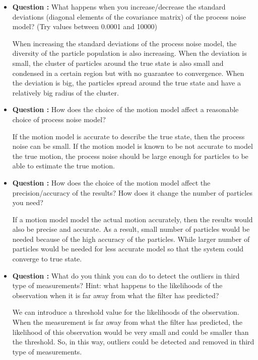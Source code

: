 \documentclass[11pt,a4paper]{article}
\begin{document}
\begin{itemize}
	\item\addtocounter{Counter}{1}\textbf{Question :} What happens when you increase/decrease the standard deviations (diagonal elements of the covariance matrix) of the process noise model? (Try values between 0.0001 and 10000)
		\par When increasing the standard deviations of the process noise model, the diversity of the particle population is also increasing. When the deviation is small, the cluster of particles around the true state is also small and condensed in a certain region but with no guarantee to convergence. When the deviation is big, the particles spread around the true state and have a relatively big radius of the cluster.

	\item\addtocounter{Counter}{1}\textbf{Question :} How does the choice of the motion model affect a reasonable choice of process noise model?
		\par If the motion model is accurate to describe the true state, then the process noise can be small. If the motion model is known to be not accurate to model the true motion, the process noise should be large enough for particles to be able to estimate the true motion.

	\item\addtocounter{Counter}{1}\textbf{Question :} How does the choice of the motion model affect the precision/accuracy of the results? How does it change the number of particles you need?
		\par If a motion model model the actual motion accurately, then the results would also be precise and accurate. As a result, small number of particles would be needed because of the high accuracy of the particles. While larger number of particles would be needed for less accurate model so that the system could converge to true state.

	\item\addtocounter{Counter}{1}\textbf{Question :} What do you think you can do to detect the outliers in third type of measurements? Hint: what happens to the likelihoods of the observation when it is far away from what the filter has predicted?
		\par We can introduce a threshold value for the likelihoods of the observation. When the measurement is far away from what the filter has predicted, the likelihood of this observation would be very small and could be smaller than the threshold. So, in this way, outliers could be detected and removed in third type of measurements.


\end{itemize}
\end{document}
